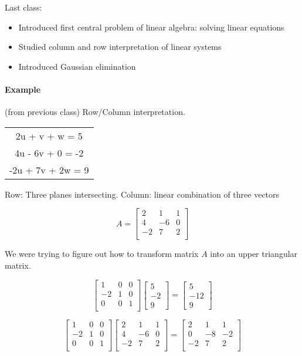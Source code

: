 \documentclass[12pt]{article}
\newcommand{\<}{\langle}
\renewcommand{\>}{\rangle}
\begin{document}
Last class:
\begin{itemize}
	\item Introduced first central problem of linear algebra: solving linear equations
	\item Studied column and row interpretation of linear systems
	\item Introduced Gaussian elimination
\end{itemize}

\paragraph{Example} (from previous class) Row/Column interpretation.

\begin{tabular}{c}
	2u + v + w = 5 \\
	4u - 6v + 0 = -2 \\
	-2u + 7v + 2w = 9
\end{tabular}

Row: Three planes intersecting. Column: linear combination of three vectors

\[
	A = \begin{bmatrix}
		2 & 1 & 1 \\
		4 & -6 & 0 \\
		-2 & 7 & 2 \\
	\end{bmatrix}
\]

We were trying to figure out how to transform matrix $A$ into an upper triangular matrix.

\[
	\begin{bmatrix}
		1 & 0 & 0 \\
		-2 & 1 & 0 \\
		0 & 0 & 1 \\
	\end{bmatrix}
	\begin{bmatrix}
		5 \\ -2 \\ 9
	\end{bmatrix}
	=
	\begin{bmatrix}
		5 \\ -12 \\ 9
	\end{bmatrix}
\]

\[
	\begin{bmatrix}
		1 & 0 & 0 \\
		-2 & 1 & 0 \\
		0 & 0 & 1 \\
	\end{bmatrix}
	\begin{bmatrix}
		2 & 1 & 1 \\
		4 & -6 & 0 \\
		-2 & 7 & 2 \\
	\end{bmatrix} = 
	\begin{bmatrix}
		2 & 1 & 1 \\
		0 & -8 & -2 \\
		-2 & 7 & 2 \\
	\end{bmatrix}
\]
\end{document}
